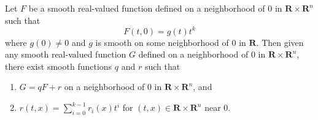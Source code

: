 Let $F$ be a smooth real-valued function defined on a neighborhood of $0$ in $\mathbf{R} \times \mathbf{R}^n$ such that
$$F(t, 0) = g(t)t^k$$
where $g(0) \neq 0$ and $g$ is smooth on some neighborhood of $0$ in $\mathbf{R}$. Then given any smooth real-valued function $G$ defined on a neighborhood of $0$ in $\mathbf{R} \times \mathbf{R}^n$, there exist smooth functions $q$ and $r$ such that
\begin{enumerate}
\item $G = qF + r$ on a neighborhood of $0$ in $\mathbf{R} \times \mathbf{R}^n$, and
\item $r(t, x) = \sum_{i=0}^{k-1} r_i(x)t^i$ for $(t, x) \in \mathbf{R} \times \mathbf{R}^n$ near $0$.
\end{enumerate}